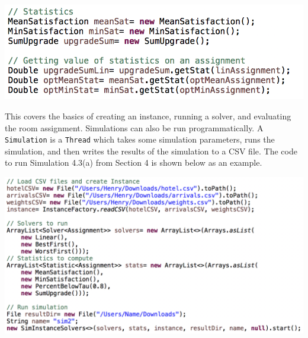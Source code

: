 \documentclass[11 pt]{article}
\begin{document}
\begin{center}
\includegraphics[scale=0.7]{images/runStatsCode.png}
\end{center}
\par This covers the basics of creating an instance, running a solver, and evaluating the room assignment. Simulations can also be run programmatically. A \texttt{Simulation} is a \texttt{Thread} which takes some simulation parameters, runs the simulation, and then writes the results of the simulation to a CSV file. The code to run Simulation 4.3(a) from Section 4 is shown below as an example.
\begin{center}
\includegraphics[scale=0.6]{images/runSimCode.png}
\end{center}
\end{document}
